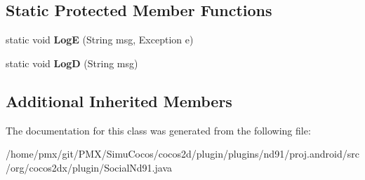 \subsection*{Static Protected Member Functions}
\begin{DoxyCompactItemize}
\item 
\mbox{\label{classorg_1_1cocos2dx_1_1plugin_1_1SocialNd91_aa31e63e57b6ead7f57a670746a4d653b}} 
static void {\bfseries LogE} (String msg, Exception e)
\item 
\mbox{\label{classorg_1_1cocos2dx_1_1plugin_1_1SocialNd91_a1242404a82e60c19a8290f38cd6fc6ec}} 
static void {\bfseries LogD} (String msg)
\end{DoxyCompactItemize}
\subsection*{Additional Inherited Members}


The documentation for this class was generated from the following file\+:\begin{DoxyCompactItemize}
\item 
/home/pmx/git/\+P\+M\+X/\+Simu\+Cocos/cocos2d/plugin/plugins/nd91/proj.\+android/src/org/cocos2dx/plugin/Social\+Nd91.\+java\end{DoxyCompactItemize}
